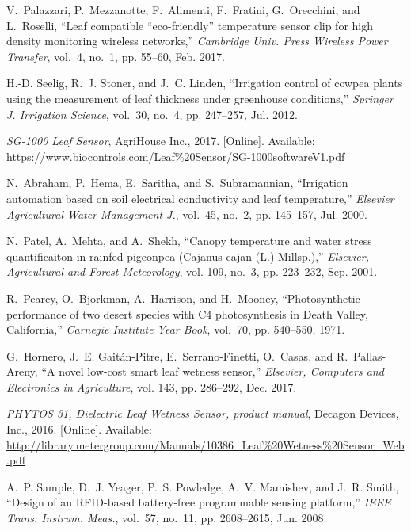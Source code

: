 \documentclass[journal]{IEEEtran}
\begin{document}
\begin{thebibliography}{10}
V.~Palazzari, P.~Mezzanotte, F.~Alimenti, F.~Fratini, G.~Orecchini, and
  L.~Roselli, ``Leaf compatible “eco-friendly” temperature sensor clip for
  high density monitoring wireless networks,'' \emph{{Cambridge Univ. Press}
  Wireless Power Transfer}, vol.~4, no.~1, pp. 55--60, Feb. 2017.

H.-D. Seelig, R.~J. Stoner, and J.~C. Linden, ``Irrigation control of cowpea
  plants using the measurement of leaf thickness under greenhouse conditions,''
  \emph{Springer J. Irrigation Science}, vol.~30, no.~4, pp. 247--257, Jul.
  2012.

\BIBentryALTinterwordspacing
\emph{SG-1000 Leaf Sensor}, AgriHouse Inc., 2017. [Online]. Available:
  \url{https://www.biocontrols.com/Leaf%20Sensor/SG-1000softwareV1.pdf}
\BIBentrySTDinterwordspacing

N.~Abraham, P.~Hema, E.~Saritha, and S.~Subramannian, ``Irrigation automation
  based on soil electrical conductivity and leaf temperature,'' \emph{Elsevier
  Agricultural Water Management J.}, vol.~45, no.~2, pp. 145--157, Jul. 2000.

N.~Patel, A.~Mehta, and A.~Shekh, ``Canopy temperature and water stress
  quantificaiton in rainfed pigeonpea ({C}ajanus cajan ({L}.) {M}illsp.),''
  \emph{Elsevier, Agricultural and Forest Meteorology}, vol. 109, no.~3, pp.
  223--232, Sep. 2001.

R.~Pearcy, O.~Bjorkman, A.~Harrison, and H.~Mooney, ``Photosynthetic
  performance of two desert species with {C4} photosynthesis in {D}eath
  {V}alley, {C}alifornia,'' \emph{Carnegie Institute Year Book}, vol.~70, pp.
  540--550, 1971.

G.~Hornero, J.~E. Gait{\'a}n-Pitre, E.~Serrano-Finetti, O.~Casas, and
  R.~Pallas-Areny, ``A novel low-cost smart leaf wetness sensor,''
  \emph{Elsevier, Computers and Electronics in Agriculture}, vol. 143, pp.
  286--292, Dec. 2017.

\BIBentryALTinterwordspacing
\emph{PHYTOS 31, Dielectric Leaf Wetness Sensor, product manual}, Decagon
  Devices, Inc., 2016. [Online]. Available:
  \url{http://library.metergroup.com/Manuals/10386_Leaf%20Wetness%20Sensor_Web.pdf}
\BIBentrySTDinterwordspacing

A.~P. Sample, D.~J. Yeager, P.~S. Powledge, A.~V. Mamishev, and J.~R. Smith,
  ``Design of an {RFID}-based battery-free programmable sensing platform,''
  \emph{{IEEE} Trans. Instrum. Meas.}, vol.~57, no.~11, pp. 2608--2615, Jun.
  2008.


\end{thebibliography}
\end{document}
